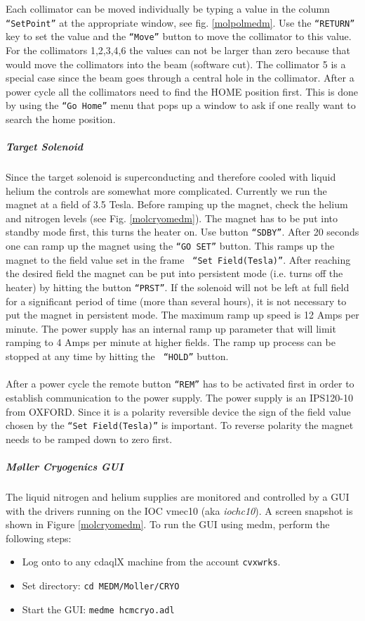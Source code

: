 {Each collimator can be moved individually be typing a value in the
column {\tt ``SetPoint''} at the appropriate window, see
fig. \ref{molpolmedm}. Use the {\tt ``RETURN''} key to set the value
and the {\tt ``Move''} button to move the collimator to this
value. For the collimators 1,2,3,4,6 the values can not be larger than
zero because that would move the collimators into the beam (software
cut). The collimator 5 is a special case since the beam goes through a
central hole in the collimator.  After a power cycle all the
collimators need to find the HOME position first.  This is done by
using the {\tt ``Go Home''} menu that pops up a window to ask if one
really want to search the home position.
%
\subparagraph{Target Solenoid}
Since the target solenoid is superconducting and therefore cooled with
liquid helium the controls are somewhat more complicated.  Currently
we run the magnet at a field of 3.5 Tesla. Before ramping up the
magnet, check the helium and nitrogen levels (see
Fig. \ref{molcryomedm}). The magnet has to be put into standby mode
first, this turns the heater on.  Use button {\tt ``SDBY''}.  After 20
seconds one can ramp up the magnet using the {\tt ``GO SET''} button.
This ramps up the magnet to the field value set in the frame {\tt
``Set Field(Tesla)''}.  After reaching the desired field the magnet
can be put into persistent mode (i.e. turns off the heater) by hitting
the button {\tt ``PRST''}.  If the solenoid will not be left at full
field for a significant period of time (more than several hours), it
is not necessary to put the magnet in persistent mode.  The maximum
ramp up speed is 12 Amps per minute.
The power supply has an internal ramp up parameter
that will limit ramping to 4 Amps per minute at higher fields.
The ramp up process can be stopped at any time by hitting the {\tt
``HOLD''} button. \\ \\
After a power cycle the remote button {\tt ``REM''} has to be activated
first in order to establish communication to the power supply.
The power supply is an IPS120-10 from OXFORD. Since it is a polarity
reversible device the sign of the field value chosen by the
{\tt ``Set Field(Tesla)''} is important. To reverse polarity the magnet
needs to be ramped down to zero first.
%

\subparagraph{M\o ller Cryogenics GUI}
The liquid nitrogen and helium supplies are monitored and controlled
by a GUI with the drivers running on the IOC vmec10 (aka {\it
iochc10}).  A screen snapshot is shown in Figure \ref{molcryomedm}.
To run the GUI using medm, perform the following steps:
\begin{itemize}
\item Log onto to any cdaqlX machine from the account \texttt{cvxwrks}.
\item Set directory: \texttt{cd MEDM/Moller/CRYO}
\item Start the GUI: \texttt{medme hcmcryo.adl}
\end{itemize}

}
